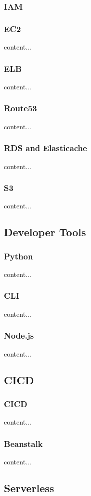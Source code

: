\documentclass{beamer}
\begin{document}
\begin{frame}\frametitle{IAM}
	
\end{frame}

\begin{frame}\frametitle{EC2}
content...
\end{frame}

\begin{frame}\frametitle{ELB}
content...
\end{frame}

\begin{frame}\frametitle{Route53}
content...
\end{frame}

\begin{frame}\frametitle{RDS and Elasticache}
content...
\end{frame}

\begin{frame}\frametitle{S3}
content...
\end{frame}


\subsection{Developer Tools}
\begin{frame}\frametitle{Python}
content...
\end{frame}

\begin{frame}\frametitle{CLI}
content...
\end{frame}

\begin{frame}\frametitle{Node.js}
content...
\end{frame}


\subsection{CICD}
\begin{frame}\frametitle{CICD}
content...
\end{frame}

\begin{frame}\frametitle{Beanstalk}
content...
\end{frame}



\subsection{Serverless}
\end{document}
